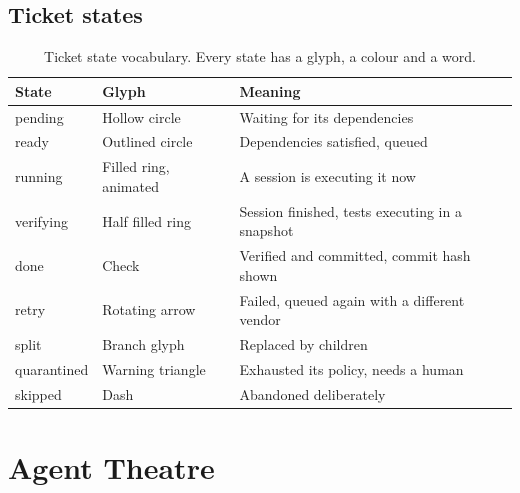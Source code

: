 \subsection{Ticket states}

\begin{table}[h]
\centering
\small
\begin{tabularx}{\textwidth}{l l X}
\toprule
\textbf{State} & \textbf{Glyph} & \textbf{Meaning} \\
\midrule
pending & Hollow circle & Waiting for its dependencies \\
ready & Outlined circle & Dependencies satisfied, queued \\
running & Filled ring, animated & A session is executing it now \\
verifying & Half filled ring & Session finished, tests executing in a snapshot \\
done & Check & Verified and committed, commit hash shown \\
retry & Rotating arrow & Failed, queued again with a different vendor \\
split & Branch glyph & Replaced by children \\
quarantined & Warning triangle & Exhausted its policy, needs a human \\
skipped & Dash & Abandoned deliberately \\
\bottomrule
\end{tabularx}
\caption{Ticket state vocabulary. Every state has a glyph, a colour and a word.}
\end{table}

\section{Agent Theatre}

